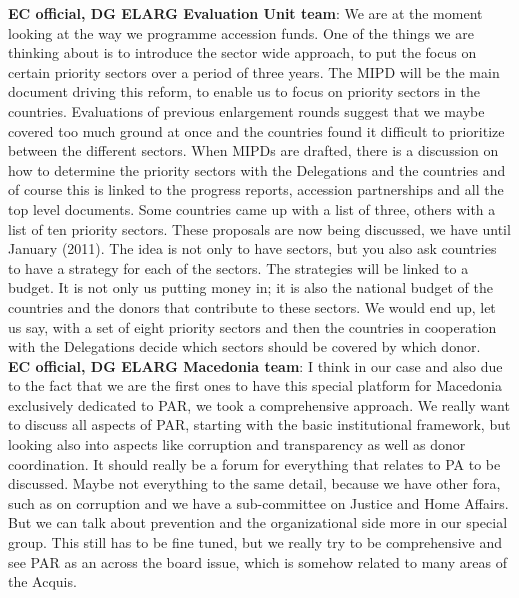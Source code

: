 \textbf{EC official, DG ELARG Evaluation Unit team}: We are at the moment looking at the way we programme accession funds. One of the things we are thinking about is to introduce the sector wide approach, to put the focus on certain priority sectors over a period of three years. The MIPD will be the main document driving this reform, to enable us to focus on priority sectors in the countries. Evaluations of previous enlargement rounds suggest that we maybe covered too much ground at once and the countries found it difficult to prioritize between the different sectors. When MIPDs are drafted, there is a discussion on how to determine the priority sectors with the Delegations and the countries and of course this is linked to the progress reports, accession partnerships and all the top level documents. Some countries came up with a list of three, others with a list of ten priority sectors. These proposals are now being discussed, we have until January (2011). The idea is not only to have sectors, but you also ask countries to have a strategy for each of the sectors. The strategies will be linked to a budget. It is not only us putting money in; it is also the national budget of the countries and the donors that contribute to these sectors. We would end up, let us say, with a set of eight priority sectors and then the countries in cooperation with the Delegations decide which sectors should be covered by which donor.\\
\textbf{EC official, DG ELARG Macedonia team}: I think in our case and also due to the fact that we are the first ones to have this special platform for Macedonia exclusively dedicated to PAR, we took a comprehensive approach. We really want to discuss all aspects of PAR, starting with the basic institutional framework, but looking also into aspects like corruption and transparency as well as donor coordination. It should really be a forum for everything that relates to PA to be discussed. Maybe not everything to the same detail, because we have other fora, such as on corruption and we have a sub-committee on Justice and Home Affairs. But we can talk about prevention and the organizational side more in our special group. This still has to be fine tuned, but we really try to be comprehensive and see PAR as an across the board issue, which is somehow related to many areas of the Acquis.\\
